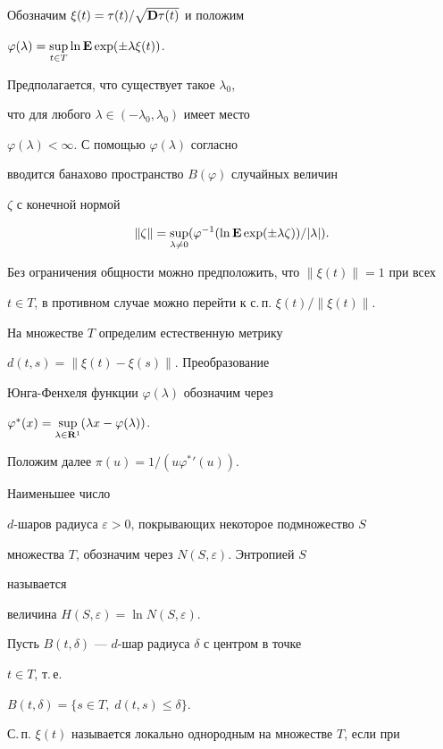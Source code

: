  


Обозначим $\xi(t)=\tau(t)/\sqrt{{\bold D}\tau(t)}$ и положим 


$\varphi(\lambda)=\sup\limits_{t\in T}\ln{\bold E}\exp(\pm\lambda\xi(t))$. 


Предполагается, что существует такое $\lambda_0$, 


что для любого $\lambda\in(-\lambda_0,\lambda_0)$ имеет место 


$\varphi(\lambda)<\infty$. С помощью $\varphi(\lambda)$ согласно 


\cite{Koz} вводится банахово пространство $B(\varphi)$ случайных величин 


$\zeta$ с конечной нормой 


$$ 


\|\zeta\|=\sup_{\lambda\ne 0}(\varphi^{-1}(\ln{\bold E} 


\exp(\pm\lambda\zeta))/|\lambda|). 


$$ 


Без ограничения общности можно предположить, что $\|\xi(t)\|=1$ при всех 


$t\in T$, в противном случае можно перейти к с.\,п. $\xi(t)/\|\xi(t)\|$. 


 


На множестве $T$ определим естественную метрику 


$d(t,s)=\|\xi(t)-\xi(s)\|$. Преобразование 


Юнга-Фенхеля функции $\varphi(\lambda)$ обозначим через 


$\varphi^*(x)=\sup\limits_{\lambda\in{\bold R}^1}(\lambda x- 


\varphi(\lambda))$. 


Положим далее $\pi(u)=1/(u\varphi^*{}'(u))$. 


Наименьшее число 


$d$-шаров радиуса $\varepsilon>0$, покрывающих некоторое подмножество $S$ 


множества $T$, обозначим через $N(S,\varepsilon)$. Энтропией $S$ 


называется 


величина $H(S,\varepsilon)=\ln N(S,\varepsilon)$. 


Пусть $B(t,\delta)$ --- $d$-шар радиуса $\delta$ с центром в точке 


$t\in T$, т.\,е. 


$B(t,\delta)=\{s\in T,\;d(t,s)\le\delta\}$. 


С.\,п. $\xi(t)$ называется локально однородным на множестве $T$, если при 


